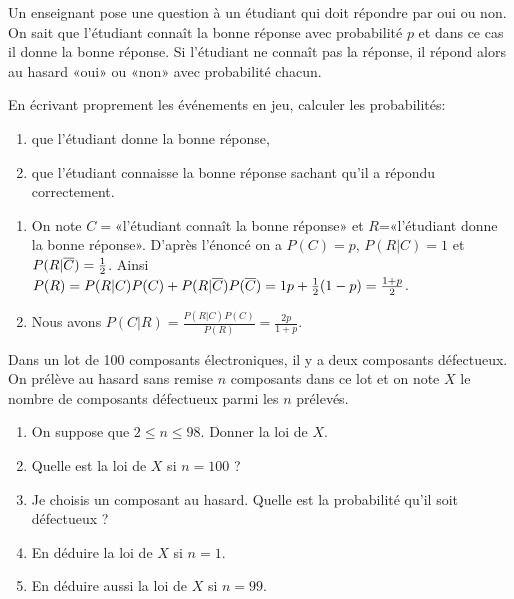 \documentclass[a4paper,11pt,reqno]{amsart}
\begin{document}
\begin{exo}

  Un enseignant pose une question à un étudiant qui doit répondre par oui ou non. On sait que l'étudiant connaît la bonne réponse avec probabilité $p$ et dans ce cas il donne la bonne réponse. Si l'étudiant ne connaît pas la réponse, il répond alors au hasard «oui» ou «non» avec probabilité  chacun.

  En écrivant proprement les événements en jeu, calculer les probabilités:
  \begin{enumerate}
    \item que l'étudiant donne la bonne réponse,

    \item que l'étudiant connaisse la bonne réponse sachant qu'il a répondu correctement.
  \end{enumerate}
\end{exo}

\begin{solution}

\begin{enumerate}
  \item On note $C=$«l'étudiant connaît la bonne réponse» et $R$=«l'étudiant donne la bonne réponse». D'après l'énoncé on a $P(C)=p$, $P(R|C)=1$ et $P(R|\overline{C})=\frac12$. Ainsi $P(R) = P(R|C)P(C) + P(R|\overline{C})P(\overline{C}) = 1p+\frac{1}{2}(1-p)=\frac{1+p}{2}$.
  \item Nous avons $P(C|R) = \frac{P(R|C)P(C)}{P(R)} = \frac{2p}{1+p}$.
\end{enumerate}

\end{solution}

\begin{exo}

   Dans un lot de 100 composants électroniques, il y a deux composants défectueux. On prélève au hasard sans remise $n$ composants dans ce lot et on note $X$ le nombre de composants défectueux parmi les $n$ prélevés.
  \begin{enumerate}
    \item On suppose que $2 \le n \le 98.$ Donner la loi de $X$.
    \item Quelle est la loi de $X$ si $n=100$ ?
    \item Je choisis un composant au hasard. Quelle est la probabilité qu'il soit défectueux ?
    \item En déduire la loi de $X$ si $n=1$.
    \item En déduire aussi la loi de $X$ si $n=99$.
  \end{enumerate}
\end{exo}
\end{document}
